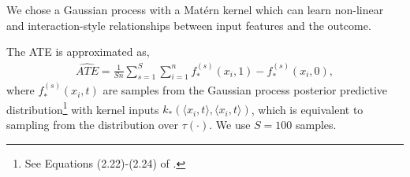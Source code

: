 \documentclass[12pt, a4paper]{article}
\begin{document}
We chose a Gaussian process with a Mat\'{e}rn kernel which can learn non-linear and 
interaction-style relationships between input features and the outcome. 


The ATE is approximated as,
\begin{align*}
  \hat{ATE} = \frac{1}{Sn} \sum^S_{s=1}\sum^n_{i=1}
    f^{(s)}_*(x_i, 1) - f^{(s)}_*(x_i, 0),
\end{align*}
where $f^{(s)}_*(x_i, t)$ are samples from the Gaussian process posterior
predictive distribution\footnote{See Equations (2.22)-(2.24)
of \citet{williams2006}.} with kernel inputs $k_*(\langle x_i, t \rangle, \langle x_i, t
\rangle)$, which is equivalent to sampling from the distribution over
$\tau(\cdot)$. We use $S=100$ samples.
\end{document}
